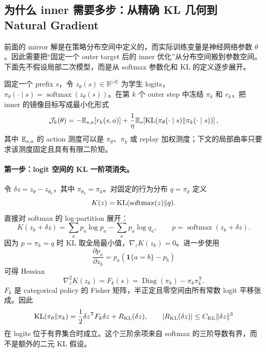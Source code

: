 \subsection{为什么 inner 需要多步：从精确 KL 几何到 Natural Gradient}
\label{sec:ch2-natural-gradient}

前面的 mirror 解是在策略分布空间中定义的，而实际训练变量是神经网络参数 $\theta$。因此需要把“固定一个 outer target 后的 inner 优化”从分布空间搬到参数空间。下面先不假设局部二次模型，而是从 softmax 参数化和 KL 的定义逐步展开。

固定一个 prefix $s$，令 $z_\theta(s)\in\mathbb R^{|\mathcal A|}$ 为学生 logits，$\pi_\theta(\cdot\mid s)=\operatorname{softmax}(z_\theta(s))$。在第 $k$ 个 outer step 中冻结 $\pi_k$ 和 $r_k$，把 inner 的镜像目标写成最小化形式
\begin{equation}
\label{eq:ch2-opd-inner-objective}
\mathcal J_k(\theta)
=
-\mathbb{E}_{s,a}[r_k(s,a)]
+\frac{1}{\eta}\mathbb{E}_s\!\left[
\operatorname{KL}\!\left(\pi_\theta(\cdot\mid s)\Vert\pi_k(\cdot\mid s)\right)
\right],
\end{equation}
其中 $\mathbb{E}_{s,a}$ 的 action 测度可以是 $\pi_\theta$、$\pi_k$ 或 replay 加权测度；下文的局部曲率只要求该测度固定且具有有限二阶矩。

\paragraph{第一步：logit 空间的 KL 一阶项消失。}
令 $\delta z=z_\theta-z_{\theta_k}$，其中 $\pi_{\theta_k}=\pi_k$。对固定的行为分布 $q=\pi_k$ 定义
\[
K(z)=\operatorname{KL}(\operatorname{softmax}(z)\Vert q).
\]
直接对 softmax 的 log-partition 展开：
\[
K(z_k+\delta z)
=
\sum_a p_a\log p_a-\sum_a p_a\log q_a,
\qquad p=\operatorname{softmax}(z_k+\delta z).
\]
因为 $p=\pi_k=q$ 时 KL 取全局最小值，$\nabla_zK(z_k)=0$。进一步使用
\[
\frac{\partial p_a}{\partial z_b}
=p_a(\mathbf 1\{a=b\}-p_b)
\]
可得 Hessian
\begin{equation}
\label{eq:ch2-logit-fisher}
\nabla_z^2K(z_k)
=
F_k(s)
=
\operatorname{Diag}(\pi_k)-\pi_k\pi_k^{\mathsf T}.
\end{equation}
$F_k$ 是 categorical policy 的 Fisher 矩阵，半正定且零空间由所有常数 logit 平移张成。因此
\begin{equation}
\label{eq:ch2-kl-logit-expansion}
\operatorname{KL}(\pi_\theta\Vert\pi_k)
=
\frac12\delta z^{\mathsf T}F_k\delta z
+R_{\mathrm{KL}}(\delta z),
\qquad
|R_{\mathrm{KL}}(\delta z)|
\leq C_{\mathrm{KL}}\|\delta z\|^3
\end{equation}
在 logits 位于有界集合时成立。这个三阶余项来自 softmax 的三阶导数有界，而不是额外的二元 KL 假设。

